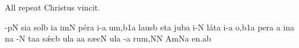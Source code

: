 \bigskip

{\itlyrics All repeat \rm Christus vincit.}

\bigskip

\initiumgregorianum
{}%
\sgn {}-p\punctum N\egn
\sgn si{}\punctum a\egn
\spatium
\sgn sol\punctum b\egn
\sgn {}i{}\punctum a\egn
\spatium
\sgn {}im\punctum N\egn
\sgn p{\'e}r\punctum a\egn
\sgn {}i-\punctum a\egn
\sgn {}u{m,}\episem b1\punctum a\egn
\spatium
\divisiominima
\spatium
\sgn la{us}\chorus\punctum b\egn
\spatium
\sgn {}et\punctum a\egn
\spatium
\sgn jub\punctum a\egn
\sgn {}i-\punctum N\egn
\sgn l{\'a}t\punctum a\egn
\sgn {}i-\punctum a\egn
\sgn {}o,\episem b1\punctum a\egn
\spatium
\divisiominima
\spatium
\sgn per\omnes\punctum a\egn
\spatium
\custos a
\lineaproxima
\sgn {}in\punctum a\egn
{}n\punctum a\egn
\sgn {}{\'\i}-\punctum N\egn
\sgn ta{}\punctum a\egn
\spatium
\sgn s{\'\ae}c\punctum b\egn
\sgn {}ul\punctum a\egn
\sgn {}a{}\punctum a\egn
\spatium
\sgn s{\ae}c\punctum N\egn
\sgn {}ul\punctum a\egn
{}-\punctum a\egn
\sgn ru{m,}\punctum N\augmentum N\egn
\spatium
\divisiofinalis
\spatium
\sgn {}Am\pes Na\egn
\sgn {}e{n.}\punctum a\augmentum b\egn
\spatium
\Finisgregoriana


\bigskip




